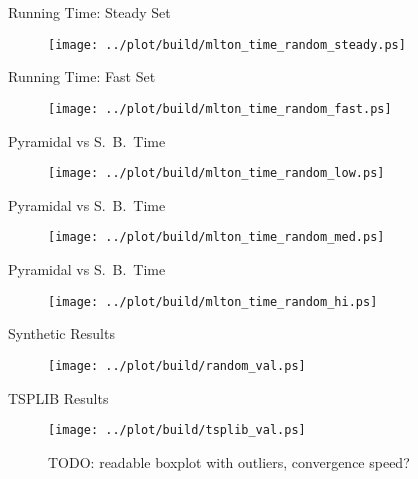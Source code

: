 \documentclass[
  size=10pt,
  style=klope,
  paper=screen,
  pauseslide,
  nopagebreaks,
  hlsections,
  fleqn
]{powerdot}
\def\todo{\color{red}}
\begin{document}
\begin{slide}[toc=Running Time]{Running Time: Steady Set}
  \begin{figure}[H]
    \centering
      \texttt{[image: ../plot/build/mlton\_time\_random\_steady.ps]}
  \end{figure}
\end{slide}
\begin{slide}[toc=]{Running Time: Fast Set}
  \begin{figure}[H]
    \centering
      \texttt{[image: ../plot/build/mlton\_time\_random\_fast.ps]}
  \end{figure}
\end{slide}
\begin{slide}[toc=]{Pyramidal vs S.\ B.\ Time}
  \begin{figure}[H]
    \centering
      \texttt{[image: ../plot/build/mlton\_time\_random\_low.ps]}
  \end{figure}
\end{slide}
\begin{slide}[toc=]{Pyramidal vs S.\ B.\ Time}
  \begin{figure}[H]
    \centering
      \texttt{[image: ../plot/build/mlton\_time\_random\_med.ps]}
  \end{figure}
\end{slide}
\begin{slide}[toc=]{Pyramidal vs S.\ B.\ Time}
  \begin{figure}[H]
    \centering
      \texttt{[image: ../plot/build/mlton\_time\_random\_hi.ps]}
  \end{figure}
\end{slide}

\begin{slide}[toc=Tours Computed]{Synthetic Results}
  \begin{figure}[H]
    \centering
    \texttt{[image: ../plot/build/random\_val.ps]}
  \end{figure}
\end{slide}

\begin{slide}[toc=]{TSPLIB Results}
  \begin{figure}[H]
    \centering
    \texttt{[image: ../plot/build/tsplib\_val.ps]}
    \caption{{\todo TODO:} readable boxplot with outliers, convergence speed?}
  \end{figure}
\end{slide}
\end{document}
